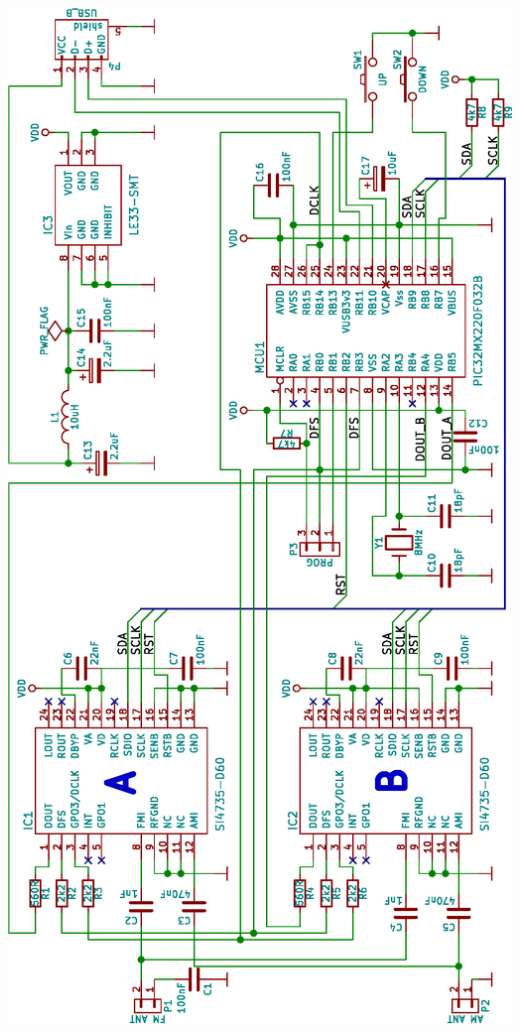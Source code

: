\documentclass[czech,master,public,dept460,male,cpdeclaration]{diploma}	%
\begin{document}
\begin{center}
 \includegraphics[scale=0.72]{figures/dfmt.eps}
\end{center}
 
\end{document}
